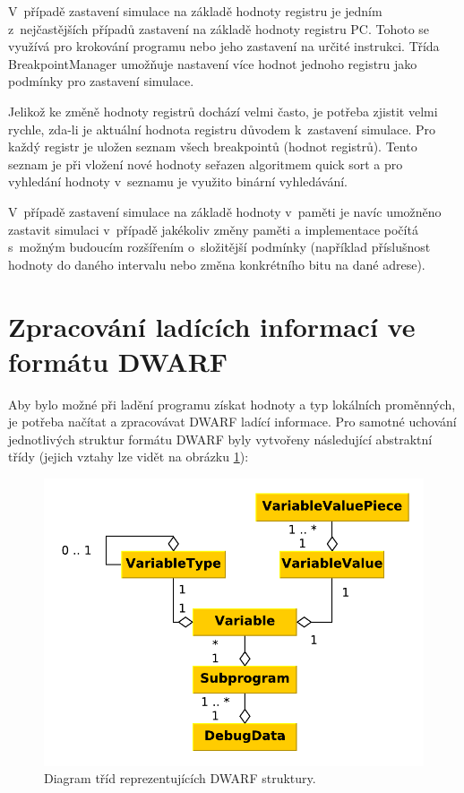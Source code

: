 V~případě zastavení simulace na základě hodnoty registru je jedním z~nejčastějších případů zastavení na základě hodnoty registru PC. Tohoto se využívá pro krokování programu nebo jeho zastavení na určité instrukci. Třída BreakpointManager umožňuje nastavení více hodnot jednoho registru jako podmínky pro zastavení simulace. 

Jelikož ke změně hodnoty registrů dochází velmi často, je potřeba zjistit velmi rychle, zda-li je aktuální hodnota registru důvodem k~zastavení simulace. Pro každý registr je uložen seznam všech breakpointů (hodnot registrů). Tento seznam je při vložení nové hodnoty seřazen algoritmem quick sort a pro vyhledání hodnoty v~seznamu je využito binární vyhledávání.

V~případě zastavení simulace na základě hodnoty v~paměti je navíc umožněno zastavit simulaci v~případě jakékoliv změny paměti a implementace počítá s~možným budoucím rozšířením o~složitější podmínky (například příslušnost hodnoty do daného intervalu nebo změna konkrétního bitu na dané adrese).

\section{Zpracování ladících informací ve formátu DWARF}
\label{label_dwarf}

Aby bylo možné při ladění programu získat hodnoty a typ lokálních proměnných, je potřeba načítat a zpracovávat DWARF ladící informace. Pro samotné uchování jednotlivých struktur formátu DWARF byly vytvořeny následující abstraktní třídy (jejich vztahy lze vidět na obrázku \ref{fig:dwarf_classes}):

\begin{figure}[h]
\centering
\includegraphics[trim=0cm 0cm 0cm 0cm, scale=0.7]{fig/dwarf_impl}
\caption{Diagram tříd reprezentujících DWARF struktury.}
\label{fig:dwarf_classes}
\end{figure}

